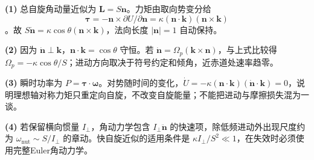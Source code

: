\par\noindent\textbf{(1)} 总自旋角动量近似为 \(\boldsymbol L=S\boldsymbol n\)。力矩由取向势变分给 \[\boldsymbol\tau=-\boldsymbol n\times\partial U/\partial\boldsymbol n=\kappa(\boldsymbol n\cdot\boldsymbol k)(\boldsymbol n\times\boldsymbol k)\]。故 \(S\dot{\boldsymbol n}=\kappa\cos\theta(\boldsymbol n\times\boldsymbol k)\)，法向长度 \(|\boldsymbol n|=1\) 自动保持。
\par\noindent\textbf{(2)} 因为 \(\dot{\boldsymbol n}\perp\boldsymbol k\)，\(\boldsymbol n\cdot\boldsymbol k=\cos\theta\) 守恒。若 \(\dot{\boldsymbol n}=\Omega_p(\boldsymbol k\times\boldsymbol n)\)，与上式比较得 \(\Omega_p=-\kappa\cos\theta/S\)；进动方向取决于符号约定和倾角，近赤道处速率趋零。
\par\noindent\textbf{(3)} 瞬时功率为 \(P=\boldsymbol\tau\cdot\boldsymbol\omega\)。对势随时间的变化，\(\dot U=-\kappa(\boldsymbol n\cdot\boldsymbol k)(\dot{\boldsymbol n}\cdot\boldsymbol k)=0\)，说明理想轴对称力矩只重定向自旋，不改变自旋能量；不能把进动与摩擦损失混为一谈。
\par\noindent\textbf{(4)} 若保留横向惯量 \(I_\perp\)，角动力学包含 \(I_\perp\ddot{\boldsymbol n}\) 的快速项，除低频进动外出现尺度约为 \(\omega_{\mathrm{nut}}\sim S/I_\perp\) 的章动。快自旋近似的适用条件是 \(\kappa I_\perp/S^2\ll1\)，在失效时必须使用完整Euler角动力学。
